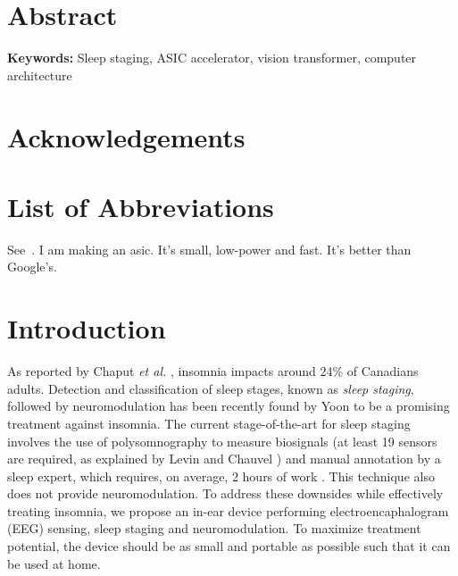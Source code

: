 \documentclass[12pt, hidelinks, draft]{article}
\begin{document}



\maketitle



\onehalfspacing


\newpage

\section*{Abstract}
    \lipsum[1]
\newline
\newline
{\bf Keywords:} Sleep staging, ASIC accelerator, vision transformer, computer architecture
\newpage

\section*{Acknowledgements}

\newpage

\tableofcontents
\newpage

\listoffigures
\newpage

\listoftables
\newpage

\section*{List of Abbreviations}

\newpage

    See~\cite{liu2021edge}.
    I am making an \ac{asic}. It's small, low-power and fast. It's better than Google's.
\section{Introduction}
\label{sec:intro}
As reported by Chaput \textit{et al.} \cite{insomnia_prevalence}, insomnia impacts around 24\% of Canadians adults. Detection and classification of sleep stages, known as \textit{sleep staging}, followed by neuromodulation has been recently found by Yoon
\cite{yoon2021neuromodulation} to be a promising treatment against insomnia. The current stage-of-the-art for sleep staging involves the use of polysomnography to measure biosignals (at least 19 sensors are required, as explained by Levin and Chauvel \cite{RUNDO2019381})
and manual annotation by a sleep expert, which requires, on average, 2 hours of work \cite{phan2022automatic}. This technique also does not provide neuromodulation. To address these downsides while effectively treating insomnia, we propose an in-ear device performing
electroencaphalogram (EEG) sensing, sleep staging and neuromodulation. To maximize treatment potential, the device should be as small and portable as possible such that it can be used at home.
\end{document}
